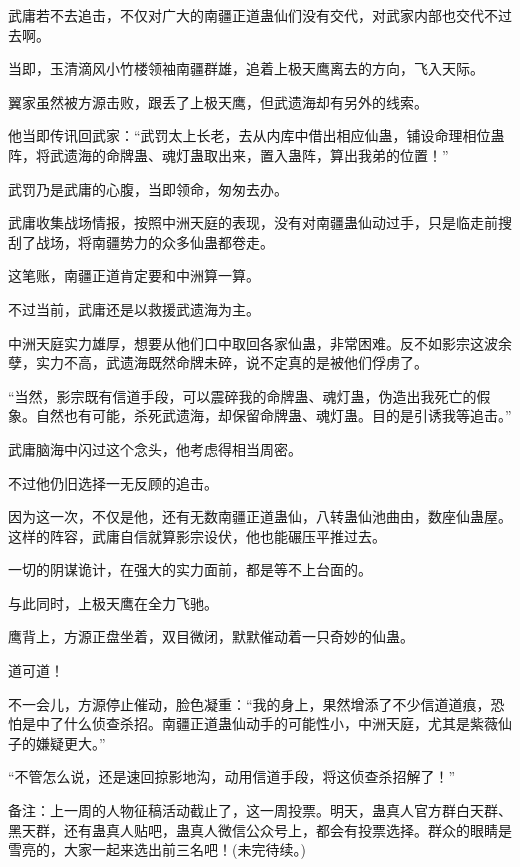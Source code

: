 \begin{this_body}
武庸若不去追击，不仅对广大的南疆正道蛊仙们没有交代，对武家内部也交代不过去啊。

当即，玉清滴风小竹楼领袖南疆群雄，追着上极天鹰离去的方向，飞入天际。

翼家虽然被方源击败，跟丢了上极天鹰，但武遗海却有另外的线索。

他当即传讯回武家：“武罚太上长老，去从内库中借出相应仙蛊，铺设命理相位蛊阵，将武遗海的命牌蛊、魂灯蛊取出来，置入蛊阵，算出我弟的位置！”

武罚乃是武庸的心腹，当即领命，匆匆去办。

武庸收集战场情报，按照中洲天庭的表现，没有对南疆蛊仙动过手，只是临走前搜刮了战场，将南疆势力的众多仙蛊都卷走。

这笔账，南疆正道肯定要和中洲算一算。

不过当前，武庸还是以救援武遗海为主。

中洲天庭实力雄厚，想要从他们口中取回各家仙蛊，非常困难。反不如影宗这波余孽，实力不高，武遗海既然命牌未碎，说不定真的是被他们俘虏了。

“当然，影宗既有信道手段，可以震碎我的命牌蛊、魂灯蛊，伪造出我死亡的假象。自然也有可能，杀死武遗海，却保留命牌蛊、魂灯蛊。目的是引诱我等追击。”

武庸脑海中闪过这个念头，他考虑得相当周密。

不过他仍旧选择一无反顾的追击。

因为这一次，不仅是他，还有无数南疆正道蛊仙，八转蛊仙池曲由，数座仙蛊屋。这样的阵容，武庸自信就算影宗设伏，他也能碾压平推过去。

一切的阴谋诡计，在强大的实力面前，都是等不上台面的。

与此同时，上极天鹰在全力飞驰。

鹰背上，方源正盘坐着，双目微闭，默默催动着一只奇妙的仙蛊。

道可道！

不一会儿，方源停止催动，脸色凝重：“我的身上，果然增添了不少信道道痕，恐怕是中了什么侦查杀招。南疆正道蛊仙动手的可能性小，中洲天庭，尤其是紫薇仙子的嫌疑更大。”

“不管怎么说，还是速回掠影地沟，动用信道手段，将这侦查杀招解了！”

备注：上一周的人物征稿活动截止了，这一周投票。明天，蛊真人官方群白天群、黑天群，还有蛊真人贴吧，蛊真人微信公众号上，都会有投票选择。群众的眼睛是雪亮的，大家一起来选出前三名吧！(未完待续。)

\end{this_body}

